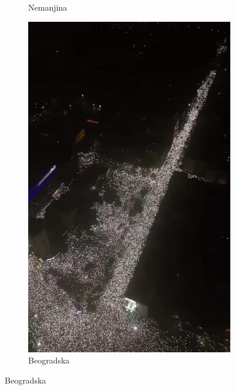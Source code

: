 \documentclass[a4paper,12pt]{article}
\begin{document}
\begin{figure}[H]
\begin{subfigure}[b]{0.3\textwidth}
	  \caption{Nemanjina}
	  \label{fig:nemanjina}
	\end{subfigure}
	\hfill
	\begin{subfigure}[b]{0.3\textwidth}
		\centering
		\includegraphics[width=\textwidth]{../images/beogradska.jpeg}
		\caption{Beogradska}
		\label{fig:beogradska}
	\end{subfigure}
  
	\vspace{0.3cm} %
  

\end{figure}
\end{document}
